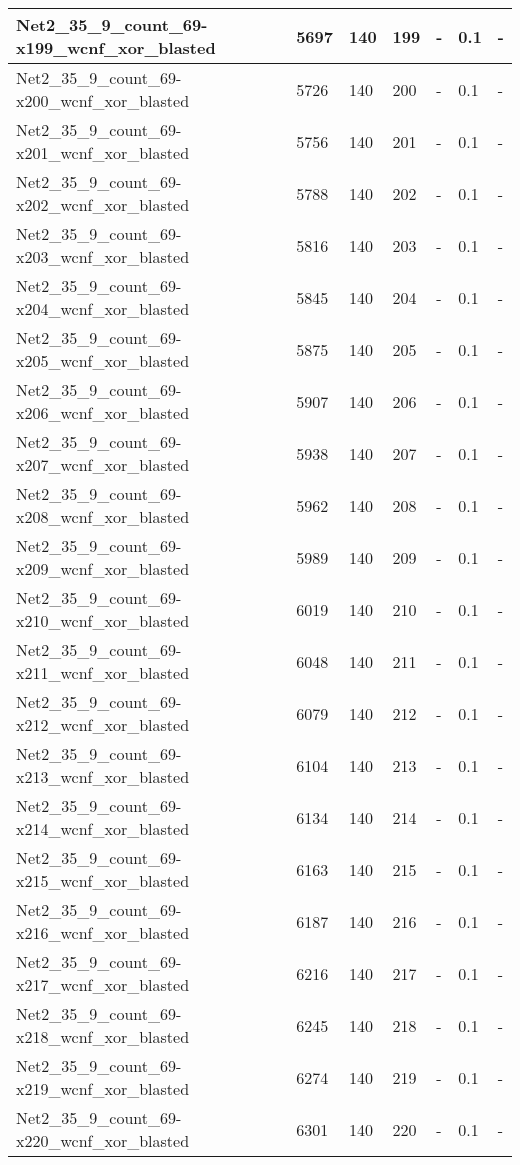 \begin{scriptsize}
\begin{longtable}{|p{5cm}|l|l|l|l|l|l|}
Net2\_35\_9\_count\_69-x199\_wcnf\_xor\_blasted&5697&140&199&-&0.1&- \\ \hline 
Net2\_35\_9\_count\_69-x200\_wcnf\_xor\_blasted&5726&140&200&-&0.1&- \\ \hline 
Net2\_35\_9\_count\_69-x201\_wcnf\_xor\_blasted&5756&140&201&-&0.1&- \\ \hline 
Net2\_35\_9\_count\_69-x202\_wcnf\_xor\_blasted&5788&140&202&-&0.1&- \\ \hline 
Net2\_35\_9\_count\_69-x203\_wcnf\_xor\_blasted&5816&140&203&-&0.1&- \\ \hline 
Net2\_35\_9\_count\_69-x204\_wcnf\_xor\_blasted&5845&140&204&-&0.1&- \\ \hline 
Net2\_35\_9\_count\_69-x205\_wcnf\_xor\_blasted&5875&140&205&-&0.1&- \\ \hline 
Net2\_35\_9\_count\_69-x206\_wcnf\_xor\_blasted&5907&140&206&-&0.1&- \\ \hline 
Net2\_35\_9\_count\_69-x207\_wcnf\_xor\_blasted&5938&140&207&-&0.1&- \\ \hline 
Net2\_35\_9\_count\_69-x208\_wcnf\_xor\_blasted&5962&140&208&-&0.1&- \\ \hline 
Net2\_35\_9\_count\_69-x209\_wcnf\_xor\_blasted&5989&140&209&-&0.1&- \\ \hline 
Net2\_35\_9\_count\_69-x210\_wcnf\_xor\_blasted&6019&140&210&-&0.1&- \\ \hline 
Net2\_35\_9\_count\_69-x211\_wcnf\_xor\_blasted&6048&140&211&-&0.1&- \\ \hline 
Net2\_35\_9\_count\_69-x212\_wcnf\_xor\_blasted&6079&140&212&-&0.1&- \\ \hline 
Net2\_35\_9\_count\_69-x213\_wcnf\_xor\_blasted&6104&140&213&-&0.1&- \\ \hline 
Net2\_35\_9\_count\_69-x214\_wcnf\_xor\_blasted&6134&140&214&-&0.1&- \\ \hline 
Net2\_35\_9\_count\_69-x215\_wcnf\_xor\_blasted&6163&140&215&-&0.1&- \\ \hline 
Net2\_35\_9\_count\_69-x216\_wcnf\_xor\_blasted&6187&140&216&-&0.1&- \\ \hline 
Net2\_35\_9\_count\_69-x217\_wcnf\_xor\_blasted&6216&140&217&-&0.1&- \\ \hline 
Net2\_35\_9\_count\_69-x218\_wcnf\_xor\_blasted&6245&140&218&-&0.1&- \\ \hline 
Net2\_35\_9\_count\_69-x219\_wcnf\_xor\_blasted&6274&140&219&-&0.1&- \\ \hline 
Net2\_35\_9\_count\_69-x220\_wcnf\_xor\_blasted&6301&140&220&-&0.1&- \\ \hline 

\end{longtable}
\end{scriptsize}

